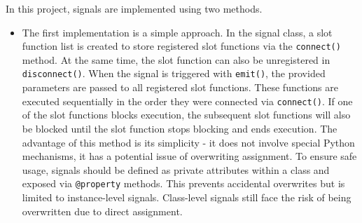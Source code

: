 \documentclass[
	english,
	ruledheaders=section,%
	class=report,%
	thesis={type=Report},%
	accentcolor=9c,%
	custommargins=true,%
	marginpar=false,%
	parskip=half-,%
	fontsize=11pt,%
	logofile={img/tuda_logo.pdf}, %
]{tudapub}
\begin{document}
In this project, signals are implemented using two methods.
\begin{itemize}

    \item The first implementation is a simple approach. In the signal class, a slot function list is created to store registered slot functions via the \texttt{connect()} method. At the same time, the slot function can also be unregistered in \texttt{disconnect()}. When the signal is triggered with \texttt{emit()}, the provided parameters are passed to all registered slot functions. These functions are executed sequentially in the order they were connected via \texttt{connect()}. If one of the slot functions blocks execution, the subsequent slot functions will also be blocked until the slot function stops blocking and ends execution. The advantage of this method is its simplicity - it does not involve special Python mechanisms, it has a potential issue of overwriting assignment. To ensure safe usage, signals should be defined as private attributes within a class and exposed via \texttt{@property} methods. This prevents accidental overwrites but is limited to instance-level signals. Class-level signals still face the risk of being overwritten due to direct assignment.
    


\end{itemize}
\end{document}
